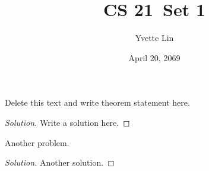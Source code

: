\documentclass[12pt]{article}
\newcommand{\classname}{CS 21}
\newcommand{\setname}{Set 1}
\newcommand{\authorname}{Yvette Lin}
\newcommand{\duedate}{April 20, 2069}
\newenvironment{problem}[2][Problem]{\begin{trivlist} \item[\hskip \labelsep {\bfseries #1}\hskip \labelsep {\bfseries #2.}]}{\end{trivlist}}
\begin{document}
 
\title{\classname \ \setname}
\author{\authorname}
\date{\duedate}
\maketitle
\thispagestyle{titlepagestyle}
 
\begin{problem}{1.1}
    Delete this text and write theorem statement here.
\end{problem}

\begin{proof}[Solution]
    Write a solution here.
\end{proof}

\pagebreak

\begin{problem}{1.2}
    Another problem.
\end{problem}

\begin{proof}[Solution]
    Another solution.
\end{proof}
\end{document}
